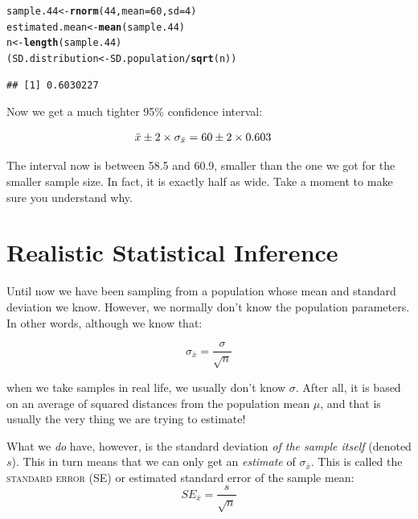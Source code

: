 \documentclass[12pt]{book}\usepackage[]{graphicx}\usepackage[]{color}
\makeatletter
\newcommand{\hlnum}[1]{\textcolor[rgb]{0.686,0.059,0.569}{#1}}%
\newcommand{\hlopt}[1]{\textcolor[rgb]{0,0,0}{#1}}%
\newcommand{\hlstd}[1]{\textcolor[rgb]{0.345,0.345,0.345}{#1}}%
\newcommand{\hlkwb}[1]{\textcolor[rgb]{0.69,0.353,0.396}{#1}}%
\newcommand{\hlkwc}[1]{\textcolor[rgb]{0.333,0.667,0.333}{#1}}%
\newcommand{\hlkwd}[1]{\textcolor[rgb]{0.737,0.353,0.396}{\textbf{#1}}}%
\newenvironment{kframe}{%
 \def\at@end@of@kframe{}%
 \ifinner\ifhmode%
  \def\at@end@of@kframe{\end{minipage}}%
  \begin{minipage}{\columnwidth}%
 \fi\fi%
 \def\FrameCommand##1{\hskip\@totalleftmargin \hskip-\fboxsep
 \colorbox{shadecolor}{##1}\hskip-\fboxsep
     \hskip-\linewidth \hskip-\@totalleftmargin \hskip\columnwidth}%
 \MakeFramed {\advance\hsize-\width
   \@totalleftmargin\z@ \linewidth\hsize
   \@setminipage}}%
 {\par\unskip\endMakeFramed%
 \at@end@of@kframe}
\newenvironment{knitrout}{}{} %
\makeatother
\begin{document}
\begin{knitrout}
\color{fgcolor}\begin{kframe}
\begin{alltt}
\hlstd{sample.44} \hlkwb{<-} \hlkwd{rnorm}\hlstd{(}\hlnum{44}\hlstd{,}\hlkwc{mean}\hlstd{=}\hlnum{60}\hlstd{,}\hlkwc{sd}\hlstd{=}\hlnum{4}\hlstd{)}
\hlstd{estimated.mean} \hlkwb{<-} \hlkwd{mean}\hlstd{(sample.44)}
\hlstd{n} \hlkwb{<-} \hlkwd{length}\hlstd{(sample.44)}
\hlstd{(SD.distribution} \hlkwb{<-} \hlstd{SD.population}\hlopt{/}\hlkwd{sqrt}\hlstd{(n))}
\end{alltt}
\begin{verbatim}
## [1] 0.6030227
\end{verbatim}
\end{kframe}
\end{knitrout}

Now we get a much tighter 95\% confidence interval:

\begin{align}
\bar{x} \pm 2 \times \sigma_{\bar{x}} & = \hbox{60} \pm 2 \times \hbox{0.603} 
\end{align}

The interval now is between 58.5
and 60.9, smaller
than the one we got for the smaller sample size.
In fact, it is exactly half as wide. Take a moment to make sure you understand why.

\section{Realistic Statistical Inference}

Until now we have been sampling from a population whose mean and
standard deviation we know. However, we normally don't know the
population parameters. In other words, although we know that:

\begin{equation}
\sigma_{\bar{x}} = \frac{\sigma}{\sqrt{n}}
\end{equation}

\noindent
when we take samples in real life, we usually don't know $\sigma$. 
After all, it is based on an average of squared distances from the population mean $\mu$, and that is usually the very thing we are trying to estimate!

What we \emph{do} have, however, is the standard deviation \emph{of the sample itself} (denoted $s$). This in turn means that we can only get an \textit{estimate} of
$\sigma_{\bar{x}}$.  
This is called the \textsc{standard error} (SE) or estimated standard error of the 
  sample mean:
\begin{equation}
SE_{\bar{x}} = \frac{s}{\sqrt{n}}
\end{equation}
\end{document}
